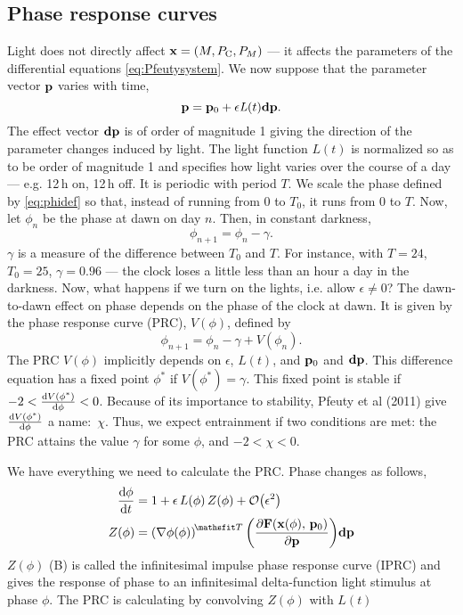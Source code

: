 \subsection{Phase response curves}
Light does not directly affect $\vb{x}=(M,P_{\text{C}},{P}_{M})$ --- it affects the
parameters of the differential equations \eqref{eq:Pfeutysystem}. We now suppose that the
parameter vector $\vb{p}$ varies with time,
\begin{equation}
\vb{p}=\vb{p}_{0}+\mathit{\epsilon L}(t)\vb{dp}.
\end{equation}
The effect vector $\vb{dp}$ is of order of magnitude 1 giving the
direction of the parameter changes induced by light. The light function 
$L(t)$ is normalized so as to be order of magnitude 1 and specifies
how light varies over the course of a day --- e.g. 12\,h on, 12\,h off. It
is periodic with period $T$. We scale the phase defined by \eqref{eq:phidef} so
that, instead of running from 0 to ${T}_{0}$, it runs from 0 to 
$T$. Now, let ${\phi}_{n}$ be the phase at dawn on day $n$.
Then, in constant darkness,
\begin{equation}
\phi_{n+1}=\phi_{n}-\gamma.
\end{equation}
$\gamma$ is a measure of the difference between ${T}_{0}$ and $T$.
For instance, with $T=24$, ${T}_{0}=25$, $\gamma =0.96$ --- the clock
loses a little less than an hour a day in the darkness. Now, what
happens if we turn on the lights, i.e. allow $\epsilon\neq0$? The
dawn-to-dawn effect on phase depends on the phase of the clock at
dawn. It is given by the phase response curve (PRC), $V(\phi)$,
defined by 
\begin{equation}
\phi_{n+1}=\phi_{n}-\gamma +V(\phi_{n}).
\end{equation}
The PRC $V(\phi)$ implicitly depends on $\epsilon$, $L(t)$, and
$\vb{p}_{0}$ and $\vb{dp}$. This difference equation has a fixed
point ${\phi}^{*}$ if $V({\phi}^{*})=\gamma $.
This fixed point is stable if  
$-2<\dv{V(\phi^{*})}{\phi}<0$. 
Because of its importance to stability, Pfeuty et al (2011) give 
$\dv{V(\phi^{*})}{\phi}$ a name:~$\chi$. 
Thus, we expect entrainment if two conditions are met: the PRC attains
the value $\gamma$ for some $\phi$, and $-2<\chi<0$. 


\bigskip
We have everything we need to calculate the PRC. Phase changes as
follows, 
\begin{equation}
\begin{aligned}
\dv{\phi}{t}&=1+\epsilon\,L(\phi)\,Z(\phi)+\order{\epsilon^2}
\\
Z(\phi)&={({\nabla}\phi(\phi))}^{\T}\,
\qty(\pdv{\vb{F}(\vb{x}(\phi),\, \vb{p}_{0})}{\vb{p}})\vb{dp}
\end{aligned}
\end{equation}
$Z(\phi)$ (B) is called the infinitesimal impulse phase
response curve (IPRC) and gives the response of phase to an
infinitesimal delta-function light stimulus at phase $\phi$. The
PRC is calculating by convolving $Z(\phi)$ with $L(t)$

